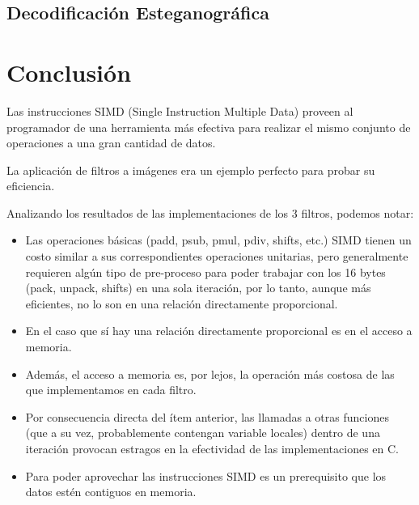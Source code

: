 \documentclass[a4paper,10pt,twoside]{article}
\begin{document}

\newpage
\subsection{Decodificaci\'on Esteganogr\'afica}






\newpage
\section{Conclusión}

Las instrucciones SIMD (Single Instruction Multiple Data) proveen al programador de una herramienta más efectiva para realizar el mismo conjunto de operaciones a una gran cantidad de datos.

La aplicación de filtros a imágenes era un ejemplo perfecto para probar su eficiencia.

Analizando los resultados de las implementaciones de los 3 filtros, podemos notar:

\begin{itemize}
\item Las operaciones básicas (padd, psub, pmul, pdiv, shifts, etc.) SIMD tienen un costo similar a sus correspondientes operaciones unitarias, pero generalmente requieren algún tipo de pre-proceso para poder trabajar con los 16 bytes (pack, unpack, shifts) en una sola iteración, por lo tanto, aunque más eficientes, no lo son en una relación directamente proporcional.
\item En el caso que sí hay una relación directamente proporcional es en el acceso a memoria.
\item Además, el acceso a memoria es, por lejos, la operación más costosa de las que implementamos en cada filtro.
\item Por consecuencia directa del ítem anterior, las llamadas a otras funciones (que a su vez, probablemente contengan variable locales) dentro de una iteración provocan estragos en la efectividad de las implementaciones en C.
\item Para poder aprovechar las instrucciones SIMD es un prerequisito que los datos estén contiguos en memoria.
\end{itemize}
\end{document}
